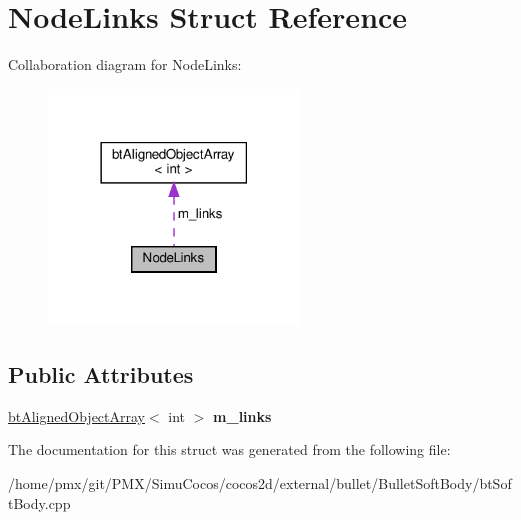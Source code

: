 \hypertarget{structNodeLinks}{}\section{Node\+Links Struct Reference}
\label{structNodeLinks}


Collaboration diagram for Node\+Links\+:
\nopagebreak
\begin{figure}[H]
\begin{center}
\leavevmode
\includegraphics[width=189pt]{structNodeLinks__coll__graph}
\end{center}
\end{figure}
\subsection*{Public Attributes}
\begin{DoxyCompactItemize}
\item 
\mbox{\label{structNodeLinks_a3e69c1399f17cbe7a61d64cb87e8ae4e}} 
\hyperlink{classbtAlignedObjectArray}{bt\+Aligned\+Object\+Array}$<$ int $>$ {\bfseries m\+\_\+links}
\end{DoxyCompactItemize}


The documentation for this struct was generated from the following file\+:\begin{DoxyCompactItemize}
\item 
/home/pmx/git/\+P\+M\+X/\+Simu\+Cocos/cocos2d/external/bullet/\+Bullet\+Soft\+Body/bt\+Soft\+Body.\+cpp\end{DoxyCompactItemize}
